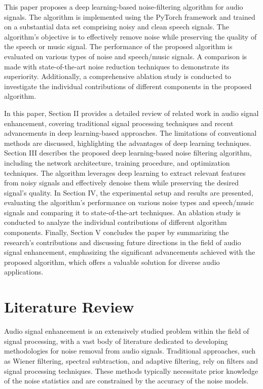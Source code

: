 \documentclass[conference]{IEEEtran}
\begin{document}
This paper proposes a deep learning-based noise-filtering algorithm for audio signals. The algorithm is implemented using the PyTorch framework and trained on a substantial data set comprising noisy and clean speech signals. The algorithm's objective is to effectively remove noise while preserving the quality of the speech or music signal. The performance of the proposed algorithm is evaluated on various types of noise and speech/music signals. A comparison is made with state-of-the-art noise reduction techniques to demonstrate its superiority. Additionally, a comprehensive ablation study is conducted to investigate the individual contributions of different components in the proposed algorithm.\cite{lu2013speech}

In this paper, Section II provides a detailed review of related work in audio signal enhancement, covering traditional signal processing techniques and recent advancements in deep learning-based approaches. The limitations of conventional methods are discussed, highlighting the advantages of deep learning techniques. Section III describes the proposed deep learning-based noise filtering algorithm, including the network architecture, training procedure, and optimization techniques. The algorithm leverages deep learning to extract relevant features from noisy signals and effectively denoise them while preserving the desired signal's quality. In Section IV, the experimental setup and results are presented, evaluating the algorithm's performance on various noise types and speech/music signals and comparing it to state-of-the-art techniques. An ablation study is conducted to analyze the individual contributions of different algorithm components. Finally, Section V concludes the paper by summarizing the research's contributions and discussing future directions in the field of audio signal enhancement, emphasizing the significant advancements achieved with the proposed algorithm, which offers a valuable solution for diverse audio applications.

\section{Literature Review}
Audio signal enhancement is an extensively studied problem within the field of signal processing, with a vast body of literature dedicated to developing methodologies for noise removal from audio signals. Traditional approaches, such as Wiener filtering, spectral subtraction, and adaptive filtering, rely on filters and signal processing techniques.\cite{sun2017multiple} These methods typically necessitate prior knowledge of the noise statistics and are constrained by the accuracy of the noise models.
\end{document}
